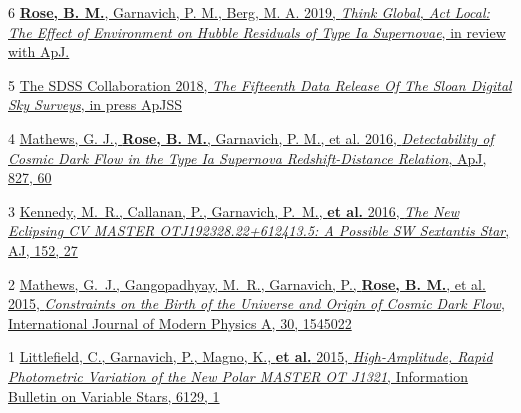\documentclass[margin]{res}
\begin{document}
\begin{resume}


\hangindent=15pt {\footnotesize \textcolor{light-gray}{6}} \href{https://ui.adsabs.harvard.edu/}{{\bf Rose, B. M.}, Garnavich, P. M., Berg, M. A. 2019, {\sl Think Global, Act Local: The Effect of Environment on Hubble Residuals of Type Ia Supernovae}, in review with ApJ.}
\vspace{-12pt}

\hangindent=15pt {\footnotesize \textcolor{light-gray}{5}} \href{https://ui.adsabs.harvard.edu/#abs/2018arXiv181202759A/abstract}{The SDSS Collaboration 2018, {\sl The Fifteenth Data Release Of The Sloan Digital Sky Surveys}, in press ApJSS}
\vspace{-12pt}

\hangindent=15pt {\footnotesize \textcolor{light-gray}{4}} \href{https://ui.adsabs.harvard.edu/#abs/2016ApJ...827...60M/abstract}{Mathews, G. J., {\bf Rose, B. M.}, Garnavich, P. M., et al. 2016, {\sl Detectability of Cosmic Dark Flow in the Type Ia Supernova Redshift-Distance Relation}, ApJ, 827, 60}

\vspace{-12pt}
\hangindent=15pt {\footnotesize \textcolor{light-gray}{3}} \href{https://ui.adsabs.harvard.edu/#abs/2016AJ....152...27K/abstract}{Kennedy, M.~R., Callanan, P., Garnavich, P.~M., {\bf et al.} 2016, {\sl The New Eclipsing CV MASTER OTJ192328.22+612413.5: A Possible SW Sextantis Star}, AJ, 152, 27}

\vspace{-12pt}
\hangindent=15pt {\footnotesize \textcolor{light-gray}{2}} \href{https://ui.adsabs.harvard.edu/#abs/2015IJMPA..3045022M/abstract}{Mathews, G.~J., Gangopadhyay, M.~R., Garnavich, P., {\bf Rose, B. M.}, et al. 2015, {\sl Constraints on the Birth of the Universe and Origin of Cosmic Dark Flow}, International Journal of Modern Physics A, 30, 1545022}

\vspace{-12pt}
\hangindent=15pt {\footnotesize \textcolor{light-gray}{1}} \href{https://ui.adsabs.harvard.edu/#abs/2015IBVS.6129....1L/abstract}{Littlefield, C., Garnavich, P., Magno, K., {\bf et al.} 2015, {\sl High-Amplitude, Rapid Photometric Variation of the New Polar MASTER OT J1321}, Information Bulletin on Variable Stars, 6129, 1}





\end{resume}
\end{document}
